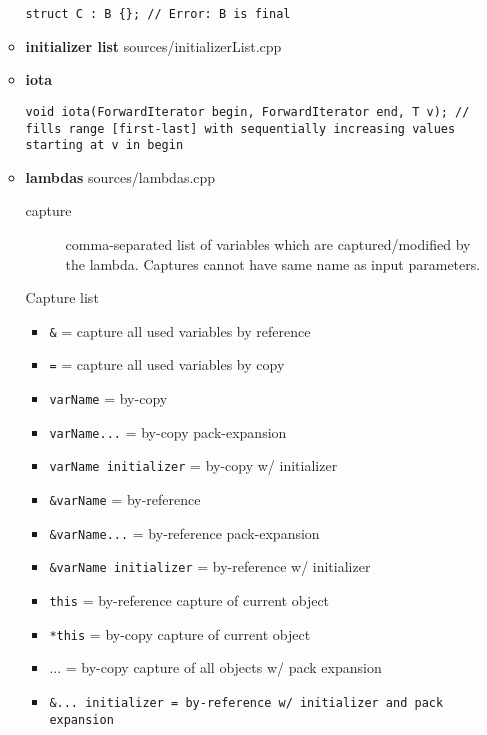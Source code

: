 \documentclass{article}
\begin{document}
\begin{itemize}
\begin{itemize}
\begin{lstlisting}[style=cpp]
struct C : B {}; // Error: B is final
         \end{lstlisting}
            \item \textbf{initializer list}
               {sources/initializerList.cpp}
            \item \textbf{iota}
              \begin{lstlisting}[style=cpp]
void iota(ForwardIterator begin, ForwardIterator end, T v); // fills range [first-last] with sequentially increasing values starting at v in begin
         \end{lstlisting}
            \item \textbf{lambdas}
               {sources/lambdas.cpp}
              \begin{description}
                \item[capture]
                  comma-separated list of variables which are captured/modified by the lambda. Captures cannot have same name as input parameters.
              \end{description}
              Capture list
              \begin{itemize}
                \item \verb!&! = capture all used variables by reference
                \item \verb!=! = capture all used variables by copy
                \item \verb!varName! = by-copy
                \item \verb!varName...! = by-copy pack-expansion
                \item \verb!varName initializer! = by-copy  w/ initializer
                \item \verb!&varName! = by-reference
                \item \verb!&varName...! = by-reference pack-expansion
                \item \verb!&varName initializer! = by-reference w/ initializer
                \item \verb!this! = by-reference capture of current object
                \item \verb!*this! = by-copy capture of current object
                \item ... = by-copy capture of all objects w/ pack expansion
                \item \verb!&... initializer = by-reference w/ initializer and pack expansion!
              \end{itemize}

\end{itemize}
\end{itemize}
\end{document}

